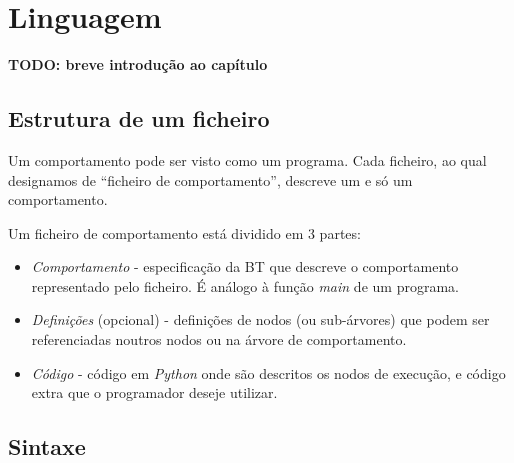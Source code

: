 
\chapter{Linguagem} %
\label{Chapter3} 

\textbf{TODO: breve introdução ao capítulo}
\section{Estrutura de um ficheiro}
Um comportamento pode ser visto como um programa. Cada ficheiro, ao qual designamos de ``ficheiro de comportamento'', descreve um e só um comportamento.

Um ficheiro de comportamento está dividido em 3 partes:
\begin{itemize}
    \item \textit{Comportamento} - especificação da BT que descreve o comportamento representado pelo ficheiro.
    É análogo à função \textit{main} de um programa.
    \item \textit{Definições} (opcional) - definições de nodos (ou sub-árvores) que podem ser referenciadas noutros nodos ou na árvore de comportamento.
    \item \textit{Código} - código em \textit{Python} onde são descritos os nodos de execução, e código extra que o programador deseje utilizar.
\end{itemize}


\section{Sintaxe}
